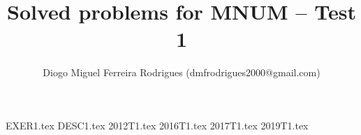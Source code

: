 \documentclass{mnum}
\title{Solved problems for MNUM -- Test 1}
\author{Diogo Miguel Ferreira Rodrigues (dmfrodrigues2000@gmail.com)}
\date{}
\begin{document}
\begingroup
\maketitle
	\let\clearpage\relax
	\tableofcontents
\endgroup
{EXER1.tex}
{DESC1.tex}
{2012T1.tex}
{2016T1.tex}
{2017T1.tex}
{2019T1.tex}
\end{document}
